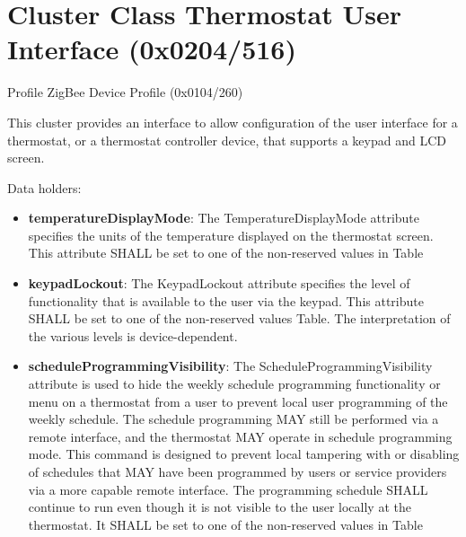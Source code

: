 \section{Cluster Class Thermostat User Interface (0x0204/516)}

Profile ZigBee Device Profile (0x0104/260)

This cluster provides an interface to allow configuration of the user interface for a thermostat, or a thermostat controller device, that supports a keypad and LCD screen.
\newline

\noindent
Data holders:

\begin{itemize}
\item \textbf{temperatureDisplayMode}: The TemperatureDisplayMode attribute specifies the units of the temperature displayed on the thermostat screen. This attribute SHALL be set to one of the non-reserved values in Table
\item \textbf{keypadLockout}: The KeypadLockout attribute specifies the level of functionality that is available to the user via the keypad. This attribute SHALL be set to one of the non-reserved values Table. The interpretation of the various levels is device-dependent.
\item \textbf{scheduleProgrammingVisibility}: The ScheduleProgrammingVisibility attribute is used to hide the weekly schedule programming functionality or menu on a thermostat from a user to prevent local user programming of the weekly schedule. The schedule programming MAY still be performed via a remote interface, and the thermostat MAY operate in schedule programming mode. This command is designed to prevent local tampering with or disabling of schedules that MAY have been programmed by users or service providers via a more capable remote interface. The programming schedule SHALL continue to run even though it is not visible to the user locally at the thermostat. It SHALL be set to one of the non-reserved values in Table
\end{itemize}

